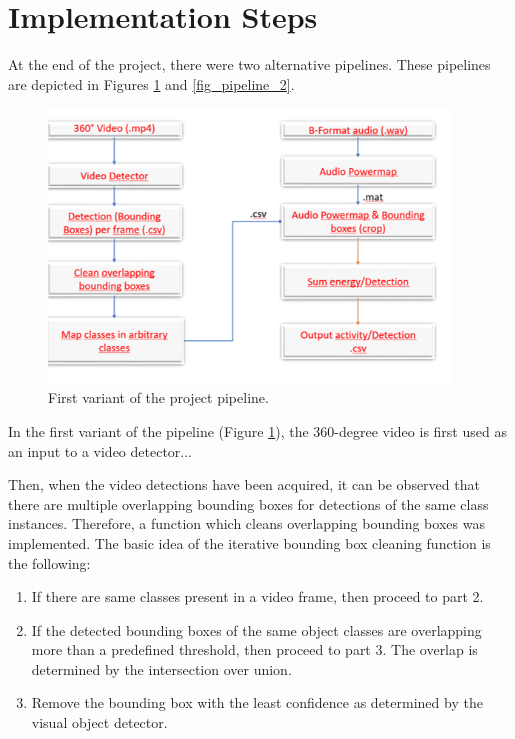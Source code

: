 \section{Implementation Steps} \label{sec_implementation_steps}

At the end of the project, there were two alternative pipelines. These pipelines are depicted in Figures \ref{fig_pipeline_1} and \ref{fig_pipeline_2}.

\begin{figure}[h]
    \centering
    \includegraphics[width=0.95\textwidth]{figures/pipeline_1.png}
    \caption{First variant of the project pipeline.}
    \label{fig_pipeline_1}
\end{figure}

In the first variant of the pipeline (Figure \ref{fig_pipeline_1}), the 360-degree video is first used as an input to a video detector...


Then, when the video detections have been acquired, it can be observed that there are multiple overlapping bounding boxes for detections of the same class instances. Therefore, a function which cleans overlapping bounding boxes was implemented. The basic idea of the iterative bounding box cleaning function is the following:

\begin{enumerate}
    \item If there are same classes present in a video frame, then proceed to part 2.
    \item If the detected bounding boxes of the same object classes are overlapping more than a predefined threshold, then proceed to part 3. The overlap is determined by the intersection over union.
    \item Remove the bounding box with the least confidence as determined by the visual object detector.
\end{enumerate}

